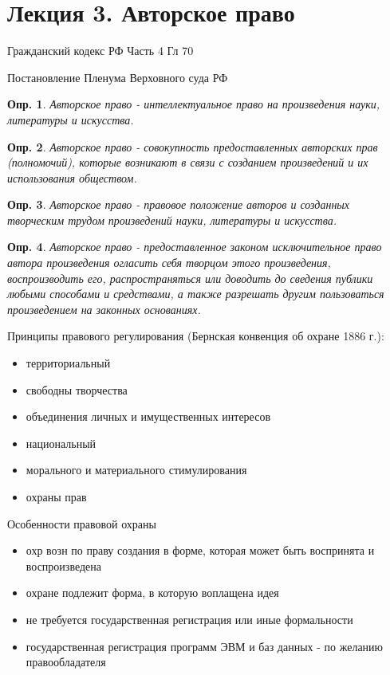 \documentclass[12pt]{article}
\newtheorem{definition}{Опр.}
\begin{document}
\section{Лекция 3. Авторское право}

Гражданский кодекс РФ Часть 4 Гл 70

Постановление Пленума Верховного суда РФ 

\begin{definition}
Авторское право  - интеллектуальное право на произведения 
науки, литературы и искусства.
\end{definition}

\begin{definition}
Авторское право - совокупность предоставленных авторских прав 
(полномочий), которые возникают в связи с созданием 
произведений и их использования обществом.
\end{definition}

\begin{definition}
Авторское право - правовое положение авторов и созданных 
творческим трудом произведений науки, литературы и искусства.
\end{definition}

\begin{definition}
Авторское право - предоставленное законом исключительное 
право автора произведения огласить себя творцом этого 
произведения, воспроизводить его, распространяться или 
доводить до сведения публики любыми способами и средствами, 
а также разрешать другим пользоваться произведением на 
законных основаниях.
\end{definition}

Принципы правового регулирования 
(Бернская конвенция об охране 1886 г.):
\begin{itemize}
\item территориальный
\item свободны творчества
\item объединения личных и имущественных интересов
\item национальный
\item морального и материального стимулирования
\item охраны прав
\end{itemize}

Особенности правовой охраны
\begin{itemize}
\item охр возн по праву создания в форме, которая может быть воспринята и воспроизведена
\item охране подлежит форма, в которую воплащена идея
\item не требуется государственная регистрация или иные формальности
\item государственная регистрация программ ЭВМ и баз данных - по желанию правообладателя
\end{itemize}
\end{document}
